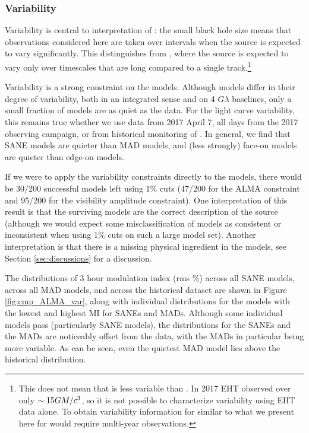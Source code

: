 \subsubsection{Variability}

Variability is central to interpretation of \sgra: the small black hole size means that observations considered here are taken over intervals when the source is expected to vary significantly.  This distinguishes \sgra from , where the source is expected to vary only over timescales that are long compared to a single track.\footnote{This does not mean that  is less variable than \sgra.  In 2017 EHT observed  over only $\sim 15GM/c^3$, so it is not possible to characterize  variability using EHT data alone.  To obtain variability information for  similar to what we present here for \sgra would require multi-year observations.}

Variability is a strong constraint on the models.  Although models differ in their degree of variability, both in an integrated sense and on 4 $G\lambda$ baselines, only a small fraction of models are as quiet as the data.  For the light curve variability, this remains true whether we use data from 2017 April 7, all days from the 2017 observing campaign, or from historical monitoring of \sgra.   In general, we find that SANE models are quieter than MAD models, and (less strongly) face-on models are quieter than edge-on models.

If we were to apply the variability constraints directly to the models, there would be 30/200 successful models left using 1\% cuts (47/200 for the ALMA constraint and 95/200 for the visibility amplitude constraint).  One interpretation of this result is that the surviving models are the correct description of the source (although we would expect some misclassification of models as consistent or inconsistent when using 1\% cuts on such a large model set).  Another interpretation is that there is a missing physical ingredient in the models, see Section \ref{sec:discussions} for a discussion.


The distributions of 3 hour modulation index (rms \%) across all SANE models, across all MAD models, and across the historical dataset are shown in Figure \ref{fig:cmp_ALMA_var}, along with individual distributions for the models with the lowest and highest MI for SANEs and MADs. Although some individual models  pass (particularly SANE models), the distributions for the SANEs and the MADs are noticeably offset from the data, with the MADs in particular being more variable. As can be seen, even the quietest MAD model lies above the historical distribution.

